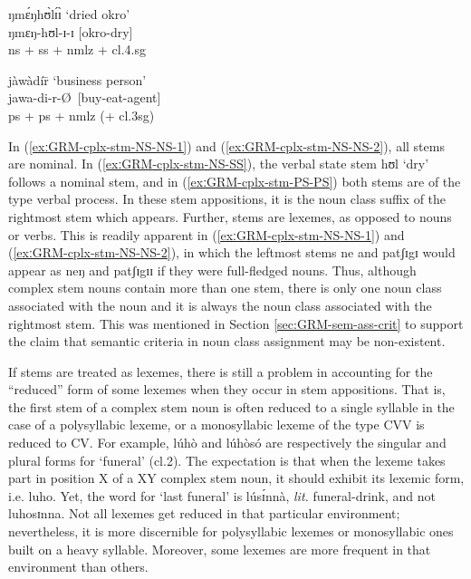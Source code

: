 \begin{exe}
\begin{exe}
\begin{exe}
\begin{exe}
\begin{exe}
\begin{exe}
 \ex\label{exːGRM-cplx-stm-NS-SS}
 {\sls ŋmɛ́ŋhʊ̀lɪ́ɪ̀} {\rm   `dried okro'}\\%
ŋmɛŋ-hʊl-ɪ-ɪ    {\rm [okro-dry]}\\%
 {\sc ns + ss + nmlz +  cl.4.sg}
 
 \ex\label{exːGRM-cplx-stm-PS-PS}
 {\sls jàwàdír̄} {\rm  `business person'}\\%
jawa-di-r-\O \  {\rm [buy-eat-agent]}\\%
 {\sc ps + ps + nmlz (+  cl.3sg)}
 
\z 
 \z


In (\ref{exːGRM-cplx-stm-NS-NS-1}) and (\ref{exːGRM-cplx-stm-NS-NS-2}),  all stems are nominal. In (\ref{exːGRM-cplx-stm-NS-SS}),  the verbal state stem {\sls hʊl} `dry'  follows a nominal stem,  and  in  (\ref{exːGRM-cplx-stm-PS-PS}) both stems are of the type verbal process.  In these stem appositions, it is the noun class suffix of the rightmost stem which appears. Further, stems are lexemes, as opposed to nouns or verbs.  This is readily apparent in  (\ref{exːGRM-cplx-stm-NS-NS-1}) and (\ref{exːGRM-cplx-stm-NS-NS-2}), in which the leftmost stems {\sls ne} and {\sls patʃɪgɪ} would appear as {\sls neŋ} and {\sls patʃɪgɪɪ} if they were full-fledged nouns. Thus, although complex stem nouns contain more than one stem, there is only  one noun class associated with the noun and it is always the noun class associated with the rightmost stem.  This was mentioned in Section \ref{sec:GRM-sem-ass-crit} to support the claim  that semantic criteria in noun class assignment may be  non-existent. 

If  stems are treated as lexemes, there is still a problem in accounting for the ``reduced'' form of  some lexemes when they occur in stem appositions. That is, the first stem  of a complex stem noun is often reduced to a single syllable in the case of a polysyllabic lexeme, or a monosyllabic lexeme of the type CVV is reduced to CV. For example,  {\sls lúhò}  and  {\sls lúhòsó} are respectively the singular and plural forms for `funeral' ({\sc cl.2}).  The expectation is that when the lexeme takes part in position X of a XY complex stem noun, it should exhibit its lexemic form, i.e.   {\sls luho}. Yet, the word for `last funeral'  is {\sls lúsɪ́nnà}, {\it lit.} funeral-drink,  and not {\sls *luhosɪnna}.  Not all  lexemes get reduced in that particular environment; nevertheless, it is  more discernible for polysyllabic lexemes or monosyllabic ones built on a heavy syllable. Moreover, some lexemes are more frequent in that environment than others.


\end{exe}
\end{exe}
\end{exe}
\end{exe}
\end{exe}
\end{exe}
